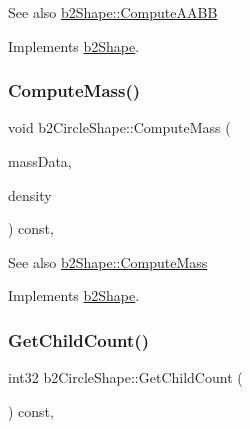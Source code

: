 \begin{DoxySeeAlso}{See also}
\hyperlink{classb2_shape_a88e9807fab0c8ca9a98d8926e50a1411}{b2\+Shape\+::\+Compute\+A\+A\+BB} 
\end{DoxySeeAlso}


Implements \hyperlink{classb2_shape_a88e9807fab0c8ca9a98d8926e50a1411}{b2\+Shape}.

\mbox{\label{classb2_circle_shape_a7dc07891abd015863fbf03076e47eec5}} 
\subsubsection{\texorpdfstring{Compute\+Mass()}{ComputeMass()}}
{\footnotesize\ttfamily void b2\+Circle\+Shape\+::\+Compute\+Mass (\begin{DoxyParamCaption}\item[{\hyperlink{structb2_mass_data}{b2\+Mass\+Data} $\ast$}]{mass\+Data,  }\item[{float32}]{density }\end{DoxyParamCaption}) const\hspace{0.3cm}{\ttfamily [override]}, {\ttfamily [virtual]}}

\begin{DoxySeeAlso}{See also}
\hyperlink{classb2_shape_a61b365526241b47f124789b0309cac69}{b2\+Shape\+::\+Compute\+Mass} 
\end{DoxySeeAlso}


Implements \hyperlink{classb2_shape_a61b365526241b47f124789b0309cac69}{b2\+Shape}.

\mbox{\label{classb2_circle_shape_a552db3402aed5d12c3177981e5208065}} 
\subsubsection{\texorpdfstring{Get\+Child\+Count()}{GetChildCount()}}
{\footnotesize\ttfamily int32 b2\+Circle\+Shape\+::\+Get\+Child\+Count (\begin{DoxyParamCaption}{ }\end{DoxyParamCaption}) const\hspace{0.3cm}{\ttfamily [override]}, {\ttfamily [virtual]}}

